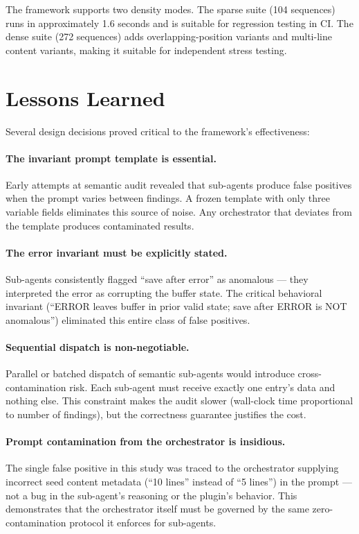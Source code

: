 \documentclass{article}
\begin{document}
The framework supports two density modes. The sparse suite (104 sequences) runs
in approximately 1.6 seconds and is suitable for regression testing in CI. The
dense suite (272 sequences) adds overlapping-position variants and multi-line
content variants, making it suitable for independent stress testing.

\section{Lessons Learned}
\label{sec:lessons}

Several design decisions proved critical to the framework's effectiveness:

\paragraph{The invariant prompt template is essential.} Early attempts at
semantic audit revealed that sub-agents produce false positives when the prompt
varies between findings. A frozen template with only three variable fields
eliminates this source of noise. Any orchestrator that deviates from the
template produces contaminated results.

\paragraph{The error invariant must be explicitly stated.} Sub-agents
consistently flagged ``save after error'' as anomalous --- they interpreted the
error as corrupting the buffer state. The critical behavioral invariant
(``ERROR leaves buffer in prior valid state; save after ERROR is NOT
anomalous'') eliminated this entire class of false positives.

\paragraph{Sequential dispatch is non-negotiable.} Parallel or batched dispatch
of semantic sub-agents would introduce cross-contamination risk. Each sub-agent
must receive exactly one entry's data and nothing else. This constraint makes
the audit slower (wall-clock time proportional to number of findings), but the
correctness guarantee justifies the cost.

\paragraph{Prompt contamination from the orchestrator is insidious.} The single
false positive in this study was traced to the orchestrator supplying incorrect
seed content metadata (``10 lines'' instead of ``5 lines'') in the prompt ---
not a bug in the sub-agent's reasoning or the plugin's behavior. This
demonstrates that the orchestrator itself must be governed by the same
zero-contamination protocol it enforces for sub-agents.
\end{document}
